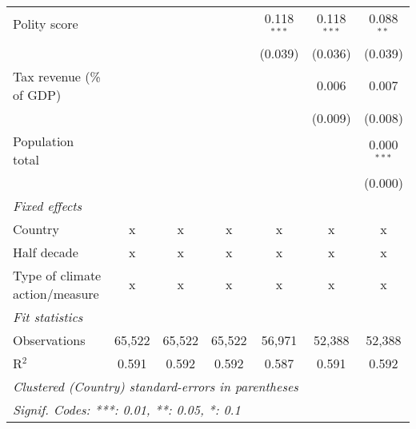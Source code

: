 \begin{tabular}{lcccccc}
   Polity score                                                        &               &                &                & 0.118$^{***}$  & 0.118$^{***}$  & 0.088$^{**}$\\   
                                                                       &               &                &                & (0.039)        & (0.036)        & (0.039)\\   
   Tax revenue (\% of GDP)                                             &               &                &                &                & 0.006          & 0.007\\   
                                                                       &               &                &                &                & (0.009)        & (0.008)\\   
   Population total                                                    &               &                &                &                &                & 0.000$^{***}$\\   
                                                                       &               &                &                &                &                & (0.000)\\   
   \emph{Fixed effects}\\
   Country                                                             & x             & x              & x              & x              & x              & x\\  
   Half decade                                                         & x             & x              & x              & x              & x              & x\\  
   Type of climate action/measure                                      & x             & x              & x              & x              & x              & x\\  
   \midrule \emph{Fit statistics}\\
   Observations                                                        & 65,522        & 65,522         & 65,522         & 56,971         & 52,388         & 52,388\\  
   R$^2$                                                               & 0.591         & 0.592          & 0.592          & 0.587          & 0.591          & 0.592\\  
   \midrule
   \multicolumn{7}{l}{\emph{Clustered (Country) standard-errors in parentheses}}\\
   \multicolumn{7}{l}{\emph{Signif. Codes: ***: 0.01, **: 0.05, *: 0.1}}\\
\end{tabular}
\par\endgroup


